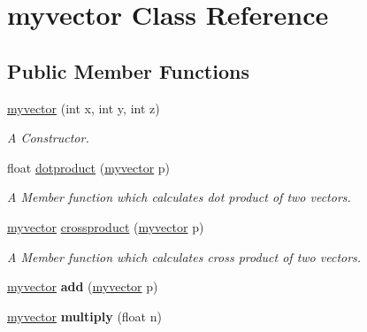 \hypertarget{classmyvector}{}\section{myvector Class Reference}
\label{classmyvector}
\subsection*{Public Member Functions}
\begin{DoxyCompactItemize}
\item 
\hyperlink{classmyvector_a50e56a1d0b5e3ba44c2cd87eb45cb7b4}{myvector} (int x, int y, int z)
\begin{DoxyCompactList}\small\item\em A Constructor. \end{DoxyCompactList}\item 
float \hyperlink{classmyvector_ab4164e997ce091642ba28a92b4db8cc6}{dotproduct} (\hyperlink{classmyvector}{myvector} p)
\begin{DoxyCompactList}\small\item\em A Member function which calculates dot product of two vectors. \end{DoxyCompactList}\item 
\hyperlink{classmyvector}{myvector} \hyperlink{classmyvector_af0caba3b74e0614eef1ccdff67372409}{crossproduct} (\hyperlink{classmyvector}{myvector} p)
\begin{DoxyCompactList}\small\item\em A Member function which calculates cross product of two vectors. \end{DoxyCompactList}\item 
\hyperlink{classmyvector}{myvector} {\bfseries add} (\hyperlink{classmyvector}{myvector} p)\hypertarget{classmyvector_a2d07d77de689b075bbbe933a777197d1}{}\label{classmyvector_a2d07d77de689b075bbbe933a777197d1}

\item 
\hyperlink{classmyvector}{myvector} {\bfseries multiply} (float n)\hypertarget{classmyvector_a8eb11a1551c0ae3093f23cbd2a8b61fd}{}\label{classmyvector_a8eb11a1551c0ae3093f23cbd2a8b61fd}

\end{DoxyCompactItemize}
